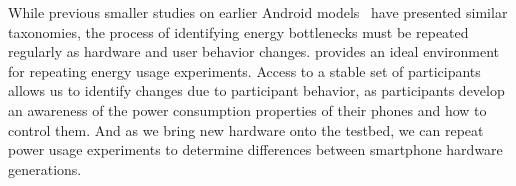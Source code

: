 While previous smaller studies on earlier Android
models~\cite{shye:micro:2009} have presented similar taxonomies, the process
of identifying energy bottlenecks must be repeated regularly as hardware and
user behavior changes. \PhoneLab{} provides an ideal environment for
repeating energy usage experiments. Access to a stable set of participants
allows us to identify changes due to participant behavior, as participants
develop an awareness of the power consumption properties of their phones and
how to control them. And as we bring new hardware onto the testbed, we can
repeat power usage experiments to determine differences between smartphone
hardware generations.

